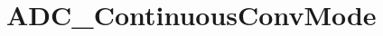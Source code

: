 \hypertarget{group___a_d_c___continuous_conv_mode}{\section{A\-D\-C\-\_\-\-Continuous\-Conv\-Mode}
\label{group___a_d_c___continuous_conv_mode}
}
